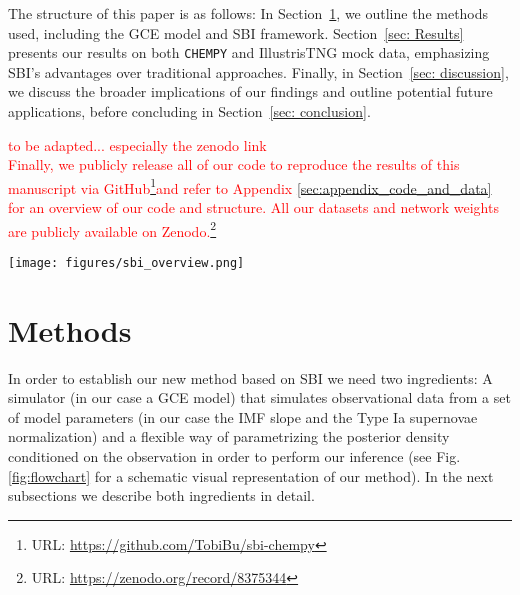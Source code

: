 \documentclass{aa}
\begin{document}
The structure of this paper is as follows: In Section~\ref{sec:methods}, we outline the methods used, including the GCE model and SBI framework. Section~\ref{sec: Results} presents our results on both \texttt{CHEMPY} and IllustrisTNG \citep{Pillepich2018} mock data, emphasizing SBI's advantages over traditional approaches. Finally, in Section~\ref{sec: discussion}, we discuss the broader implications of our findings and outline potential future applications, before concluding in Section~\ref{sec: conclusion}.




\textcolor{red}{to be adapted... especially the zenodo link\\
Finally, we publicly release all of our code to reproduce the results of this manuscript via GitHub\footnote{URL: {\url{https://github.com/TobiBu/sbi-chempy}}}and refer to Appendix \ref{sec:appendix_code_and_data} for an overview of our code and structure. All our datasets and network weights are publicly available on Zenodo.\footnote{URL: \url{https://zenodo.org/record/8375344}}}

\begin{figure*}[]
     \centering
     \texttt{[image: figures/sbi\_overview.png]}
     \vspace{-.5cm}
     \caption{SBI flow chart. From a set of priors we simulate a sample of stellar abundances using \texttt{CHEMPY} \citep{Rybizki_2017,Philcox_2019} which we use to train a \emph{neural network} emulator to speed up the data generation process. Using the \emph{neural network} emulator we produce training data to train the Neural Density Estimator. With this we infer the posterior distribution of the model parameters from a single star. Repeating that for $N_{\rm stars}$ from the same galaxy gives an accurate fit of the IMF slope and Type Ia supernovae normalization.}
     \label{fig:flowchart}
\end{figure*}

\section{Methods}
\label{sec:methods}

In order to establish our new method based on SBI we need two ingredients: A simulator (in our case a GCE model) that simulates observational data from a set of model parameters (in our case the IMF slope and the Type Ia supernovae normalization) and a flexible way of parametrizing the posterior density conditioned on the observation in order to perform our inference (see Fig. \ref{fig:flowchart} for a schematic visual representation of our method). In the next subsections we describe both ingredients in detail.
\end{document}
